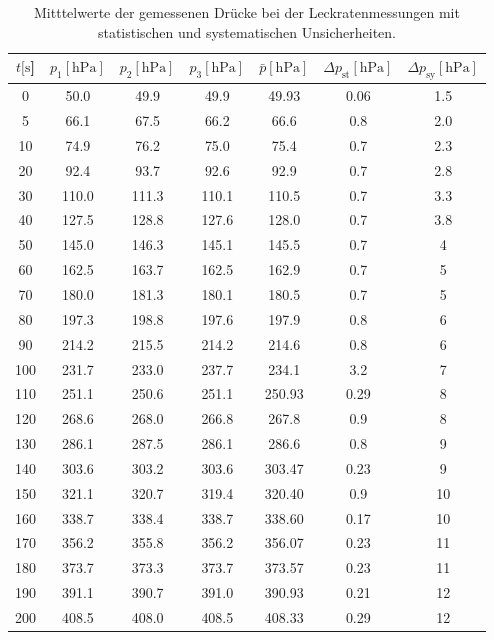 %
\begin{table}[H]
  \centering
    \caption{Mitttelwerte der gemessenen Drücke bei der Leckratenmessungen mit statistischen und systematischen Unsicherheiten.}
    \label{tab:Dreh_Leck3}
    \begin{tabular}{
      S[table-format=3.0] 
      S[table-format=3.1] S[table-format=3.1] S[table-format=3.1]
      S[table-format=3.2] S[table-format=1.2] S[table-format=2.1]
      }
      \toprule
      {$t [\si{\second}$]} &
      {$p_1 [\si{\hecto\pascal}]$} & {$p_2 [\si{\hecto\pascal}]$} & {$p_3 [\si{\hecto\pascal}]$} &
      {$\bar{p} [\si{\hecto\pascal}]$} & {$\Delta p_\text{st} [\si{\hecto\pascal}]$} & {$\Delta p_\text{sy} [\si{\hecto\pascal}]$}\\
         & 50.0  & 49.9  & 49.9  & 49.93  & 0.06  & 1.5  \\
      5   & 66.1  & 67.5  & 66.2  & 66.6   & 0.8   & 2.0  \\
      10  & 74.9  & 76.2  & 75.0  & 75.4   & 0.7   & 2.3  \\
      20  & 92.4  & 93.7  & 92.6  & 92.9   & 0.7   & 2.8  \\
      30  & 110.0 & 111.3 & 110.1 & 110.5  & 0.7   & 3.3  \\
      40  & 127.5 & 128.8 & 127.6 & 128.0  & 0.7   & 3.8  \\
      50  & 145.0 & 146.3 & 145.1 & 145.5  & 0.7   & 4    \\
      60  & 162.5 & 163.7 & 162.5 & 162.9  & 0.7   & 5    \\
      70  & 180.0 & 181.3 & 180.1 & 180.5  & 0.7   & 5    \\
      80  & 197.3 & 198.8 & 197.6 & 197.9  & 0.8   & 6    \\
      90  & 214.2 & 215.5 & 214.2 & 214.6  & 0.8   & 6    \\
      100 & 231.7 & 233.0 & 237.7 & 234.1  & 3.2   & 7    \\
      110 & 251.1 & 250.6 & 251.1 & 250.93 & 0.29  & 8    \\
      120 & 268.6 & 268.0 & 266.8 & 267.8  & 0.9   & 8    \\
      130 & 286.1 & 287.5 & 286.1 & 286.6  & 0.8   & 9    \\
      140 & 303.6 & 303.2 & 303.6 & 303.47 & 0.23  & 9    \\
      150 & 321.1 & 320.7 & 319.4 & 320.40 & 0.9   & 10   \\
      160 & 338.7 & 338.4 & 338.7 & 338.60 & 0.17  & 10   \\
      170 & 356.2 & 355.8 & 356.2 & 356.07 & 0.23  & 11   \\
      180 & 373.7 & 373.3 & 373.7 & 373.57 & 0.23  & 11   \\
      190 & 391.1 & 390.7 & 391.0 & 390.93 & 0.21  & 12   \\
      200 & 408.5 & 408.0 & 408.5 & 408.33 & 0.29  & 12   \\
      \bottomrule
    \end{tabular}
\end{table}
